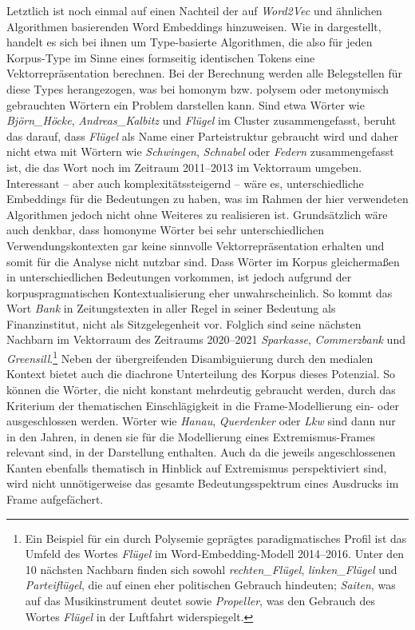 \largerpage
Letztlich ist noch einmal auf einen Nachteil der auf \emph{Word2Vec} und ähnlichen Algorithmen basierenden Word Embeddings hinzuweisen. Wie in  dargestellt, handelt es sich bei ihnen um Type-basierte Algorithmen, die also für jeden Korpus-Type im Sinne eines formseitig identischen Tokens eine Vektorrepräsentation berechnen. Bei der Berechnung werden alle Belegstellen für diese Types herangezogen, was bei homonym bzw. polysem oder metonymisch gebrauchten Wörtern ein Problem darstellen kann. Sind etwa Wörter wie \emph{Björn\_Höcke}, \emph{Andreas\_Kalbitz} und \emph{Flügel} im Cluster  zusammengefasst, beruht das darauf, dass \emph{Flügel} als Name einer Parteistruktur gebraucht wird und daher nicht etwa mit Wörtern wie \emph{Schwingen}, \emph{Schnabel} oder \emph{Federn} zusammengefasst ist, die das Wort noch im Zeitraum 2011--2013 im Vektorraum umgeben. Interessant -- aber auch komplexitätssteigernd -- wäre es, unterschiedliche Embeddings für die Bedeutungen zu haben, was im Rahmen der hier verwendeten Algorithmen jedoch nicht ohne Weiteres zu realisieren ist. Grundsätzlich wäre auch denkbar, dass homonyme Wörter bei sehr unterschiedlichen Verwendungskontexten gar keine sinnvolle Vektorrepräsentation erhalten und somit für die Analyse nicht nutzbar sind. Dass Wörter im Korpus gleichermaßen in unterschiedlichen Bedeutungen vorkommen, ist jedoch aufgrund der korpuspragmatischen Kontextualisierung eher unwahrscheinlich. So kommt das Wort \emph{Bank} in Zeitungstexten in aller Regel in seiner Bedeutung als Finanzinstitut, nicht als Sitzgelegenheit vor. Folglich sind seine nächsten Nachbarn im Vektorraum des Zeitraums 2020--2021 \emph{Sparkasse}, \emph{Commerzbank} und \emph{Greensill}.\footnote{Ein Beispiel für ein durch Polysemie geprägtes paradigmatisches Profil ist das Umfeld des Wortes \emph{Flügel} im Word-Embedding-Modell 2014--2016. Unter den 10 nächsten Nachbarn finden sich sowohl \emph{rechten\_Flügel}, \emph{linken\_Flügel} und \emph{Parteiflügel}, die auf einen eher politischen Gebrauch hindeuten; \emph{Saiten}, was auf das Musikinstrument deutet sowie \emph{Propeller}, was den Gebrauch des Wortes \emph{Flügel} in der Luftfahrt widerspiegelt.} Neben der übergreifenden Disambiguierung durch den medialen Kontext bietet auch die diachrone Unterteilung des Korpus dieses Potenzial. So können die Wörter, die nicht konstant mehrdeutig gebraucht werden, durch das Kriterium der thematischen Einschlägigkeit in die Frame-Modellierung ein- oder ausgeschlossen werden. Wörter wie \emph{Hanau}, \emph{Querdenker} oder \emph{Lkw} sind dann nur in den Jahren, in denen sie für die Modellierung eines Extremismus-Frames relevant sind, in der Darstellung enthalten. Auch da die jeweils angeschlossenen Kanten ebenfalls thematisch in Hinblick auf Extremismus perspektiviert sind, wird nicht unnötigerweise das gesamte Bedeutungsspektrum eines Ausdrucks im Frame aufgefächert.
